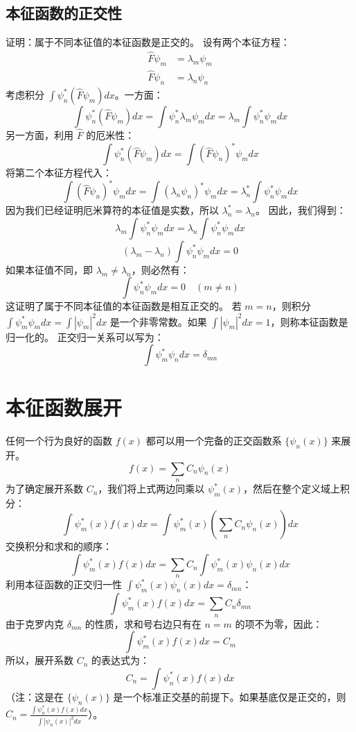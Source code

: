 \documentclass{article}
\begin{document}
	\subsection{本征函数的正交性}
	证明：属于不同本征值的本征函数是正交的。
	设有两个本征方程：
	\begin{align*}
		\hat{F}\psi_m &= \lambda_m \psi_m \\
		\hat{F}\psi_n &= \lambda_n \psi_n
	\end{align*}
	考虑积分 $\int \psi_n^* (\hat{F}\psi_m) dx$。一方面：
	$$
	\int \psi_n^* (\hat{F}\psi_m) dx = \int \psi_n^* \lambda_m \psi_m dx = \lambda_m \int \psi_n^* \psi_m dx
	$$
	另一方面，利用 $\hat{F}$ 的厄米性：
	$$
	\int \psi_n^* (\hat{F}\psi_m) dx = \int (\hat{F}\psi_n)^* \psi_m dx
	$$
	将第二个本征方程代入：
	$$
	\int (\hat{F}\psi_n)^* \psi_m dx = \int (\lambda_n\psi_n)^* \psi_m dx = \lambda_n^* \int \psi_n^* \psi_m dx
	$$
	因为我们已经证明厄米算符的本征值是实数，所以 $\lambda_n^* = \lambda_n$。
	因此，我们得到：
	$$
	\lambda_m \int \psi_n^* \psi_m dx = \lambda_n \int \psi_n^* \psi_m dx
	$$
	$$
	(\lambda_m - \lambda_n) \int \psi_n^* \psi_m dx = 0
	$$
	如果本征值不同，即 $\lambda_m \neq \lambda_n$，则必然有：
	$$
	\int \psi_n^* \psi_m dx = 0 \quad (m \neq n)
	$$
	这证明了属于不同本征值的本征函数是相互正交的。
	若 $m=n$，则积分 $\int \psi_m^* \psi_m dx = \int |\psi_m|^2 dx$ 是一个非零常数。如果 $\int |\psi_m|^2 dx = 1$，则称本征函数是归一化的。
	正交归一关系可以写为：
	$$
	\int \psi_m^* \psi_n dx = \delta_{mn}
	$$
	
	\section{本征函数展开}
	任何一个行为良好的函数 $f(x)$ 都可以用一个完备的正交函数系 $\{\psi_n(x)\}$ 来展开。
	$$
	f(x) = \sum_n C_n \psi_n(x)
	$$
	为了确定展开系数 $C_n$，我们将上式两边同乘以 $\psi_m^*(x)$，然后在整个定义域上积分：
	$$
	\int \psi_m^*(x) f(x) dx = \int \psi_m^*(x) \left( \sum_n C_n \psi_n(x) \right) dx
	$$
	交换积分和求和的顺序：
	$$
	\int \psi_m^*(x) f(x) dx = \sum_n C_n \int \psi_m^*(x) \psi_n(x) dx
	$$
	利用本征函数的正交归一性 $\int \psi_m^*(x) \psi_n(x) dx = \delta_{mn}$：
	$$
	\int \psi_m^*(x) f(x) dx = \sum_n C_n \delta_{mn}
	$$
	由于克罗内克 $\delta_{mn}$ 的性质，求和号右边只有在 $n=m$ 的项不为零，因此：
	$$
	\int \psi_m^*(x) f(x) dx = C_m
	$$
	所以，展开系数 $C_n$ 的表达式为：
	$$
	C_n = \int \psi_n^*(x) f(x) dx
	$$
	（注：这是在 $\{\psi_n(x)\}$ 是一个标准正交基的前提下。如果基底仅是正交的，则 $C_n = \frac{\int \psi_n^*(x) f(x) dx}{\int |\psi_n(x)|^2 dx}$）。
\end{document}
